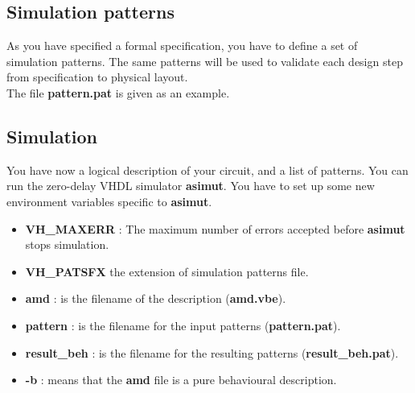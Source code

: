\documentclass[11pt,a4]{article}
\begin{document}
\subsection{Simulation patterns}
As you have specified a formal specification,
you have to define a set of simulation patterns.
The same patterns will be used to validate each design step
from specification to physical layout.
\\
The file {\bf pattern.pat} is given as an example.

\subsection{Simulation}
You have now a logical description of your circuit, and a list of patterns.
You can run the zero-delay VHDL simulator {\bf asimut}.
You have to set up some new environment variables specific to {\bf asimut}.\\

\begin{itemize}
\item 
{\bf VH\_MAXERR} : The maximum number of errors accepted before {\bf asimut} stops simulation.
\end{itemize}

\fbox{
\shortstack[l]{
{\bf  $>$ VH\_PATSFX=pat] }\\
{\bf  $>$ export VH\_PATSFX]}
}}

\begin{itemize}
\item {\bf VH\_PATSFX} the extension of simulation patterns file.
\end{itemize}

\begin{itemize}
\item {\bf amd} : is the filename of the description ({\bf amd.vbe}).
\item {\bf pattern} : is the filename for the input patterns ({\bf pattern.pat}).
\item {\bf result\_beh} : is the filename for the resulting patterns ({\bf result\_beh.pat}).
\item {\bf -b} : means that the {\bf amd} file is a pure behavioural description.
\end{itemize}
\end{document}
